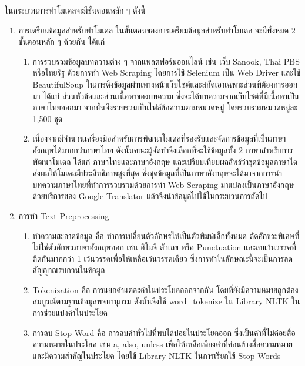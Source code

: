 \documentclass[12pt,oneside,openright,a4paper]{cpe-thai-project}
\begin{document}
  \hspace{1cm}ในกระบวนการทำโมเดลจะมีขั้นตอนหลัก ๆ ดังนี้
  \begin{enumerate}
    \item การเตรียมข้อมูลสำหรับทำโมเดล
          \newline\hspace*{1cm}ในขั้นตอนของการเตรียมข้อมูลสำหรับทำโมเดล จะมีทั้งหมด 2 ขั้นตอนหลัก ๆ ด้วยกัน ได้แก่
          \begin{enumerate}
            \item การรวบรวมข้อมูลบทความต่าง ๆ จากแพลตฟอร์มออนไลน์ เช่น เว็บ Sanook, Thai PBS หรือไทยรัฐ ด้วยการทำ Web Scraping 
            โดยการใช้ Selenium เป็น Web Driver และใช้ BeautifulSoup ในการดึงข้อมูลผ่านทางหน้าเว็บไซต์และสกัดเอาเฉพาะส่วนที่ต้องการออกมา 
            ได้แก่ ส่วนหัวข้อและส่วนเนื้อหาของบทความ ซึ่งจะได้บทความจากเว็บไซต์ที่มีเนื้อหาเป็นภาษาไทยออกมา
            จากนั้นจึงรวบรวมเป็นไฟล์ข้อความตามหมวดหมู่ โดยรวบรวมหมวดหมู่ละ 1,500 ชุด
            \item เนื่องจากมีจำนวนเครื่องมิอสำหรับการพัฒนาโมเดลที่รองรับและจัดการข้อมูลที่เป็นภาษาอังกฤษได้มากกว่าภาษาไทย
            ดังนั้นคณะผู้จัดทำจึงเลือกที่จะใช้ข้อมูลทั้ง 2 ภาษาสำหรับการพัฒนาโมเดล ได้แก่ ภาษาไทยและภาษาอังกฤษ 
            และเปรียบเทียบผลลัพธ์ว่าชุดข้อมูลภาษาใดส่งผลให้โมเดลมีประสิทธิภาพสูงที่สุด 
            ซึ่งชุดข้อมูลที่เป็นภาษาอังกฤษจะได้มาจากการนำบทความภาษาไทยที่ทำการรวบรวมด้วยการทำ Web Scraping
            มาแปลงเป็นภาษาอังกฤษด้วยบริการของ Google Translator แล้วจึงนำข้อมูลไปใช้ในกระบวนการถัดไป
          \end{enumerate}
    \item การทำ Text Preprocessing
          \begin{enumerate}
            \item ทำความสะอาดข้อมูล คือ ทำการเปลี่ยนตัวอักษรให้เป็นตัวพิมพ์เล็กทั้งหมด ตัดอักขระพิเศษที่ไม่ใช่ตัวอักษรภาษาอังกฤษออก เช่น อิโมจิ ตัวเลข หรือ Punctuation 
            และลบเว้นวรรคที่ติดกันมากกว่า 1 เว้นวรรคเพื่อให้เหลือเว้นวรรคเดียว ซึ่งการทําในลักษณะนี้จะเป็นการลดสัญญาณรบกวนในข้อมูล
            \item Tokenization คือ การแยกคำแต่ละคำในประโยคออกจากกัน โดยที่ยังมีความหมายถูกต้องสมบูรณ์ตามฐานข้อมูลพจนานุกรม 
            ดังนั้นจึงใช้ word\_tokenize ใน Library NLTK ในการช่วยแบ่งคำในประโยค
            \item การลบ Stop Word คือ การลบคำทั่วไปที่พบได้บ่อยในประโยคออก ซึ่งเป็นคำที่ไม่ค่อยสื่อความหมายในประโยค เช่น a, also, unless 
            เพื่อให้เหลือเพียงคำที่ค่อนข้างสื่อความหมายและมีความสำคัญในประโยค โดยใช้ Library NLTK ในการเรียกใช้ Stop Words 

\end{enumerate}
\end{enumerate}
\end{document}
